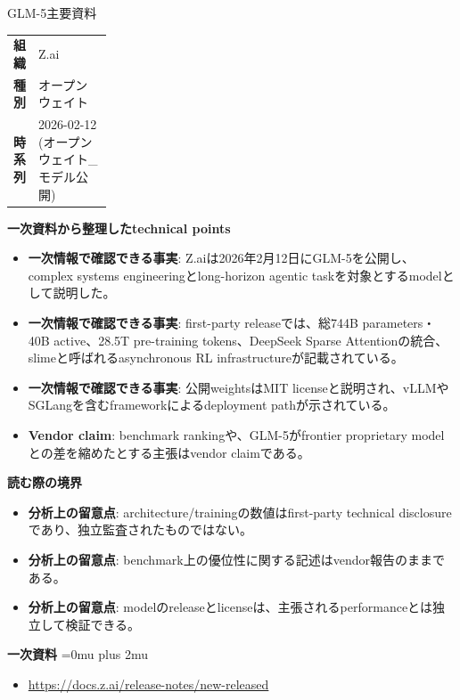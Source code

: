 \begin{technicalnote}{GLM-5}{主要資料}
\begingroup
\begin{tabularx}{\linewidth}{@{}>{\bfseries}p{0.22\linewidth}X@{}}
組織 & Z.ai \\
種別 & オープンウェイト \\
時系列 & 2026-02-12 (オープンウェイト\_モデル公開) \\
\end{tabularx}
\smallskip
{\bfseries 一次資料から整理したtechnical points}
\begin{itemize}[leftmargin=1.5em,itemsep=0.35em]
\item \textbf{一次情報で確認できる事実}: Z.aiは2026年2月12日にGLM-5を公開し、complex systems engineeringとlong-horizon agentic taskを対象とするmodelとして説明した。
\item \textbf{一次情報で確認できる事実}: first-party releaseでは、総744B parameters・40B active、28.5T pre-training tokens、DeepSeek Sparse Attentionの統合、slimeと呼ばれるasynchronous RL infrastructureが記載されている。
\item \textbf{一次情報で確認できる事実}: 公開weightsはMIT licenseと説明され、vLLMやSGLangを含むframeworkによるdeployment pathが示されている。
\item \textbf{Vendor claim}: benchmark rankingや、GLM-5がfrontier proprietary modelとの差を縮めたとする主張はvendor claimである。
\end{itemize}
\begin{minipage}{\linewidth}
{\bfseries 読む際の境界}
\begin{itemize}[leftmargin=1.5em,itemsep=0.35em]
\item \textbf{分析上の留意点}: architecture/trainingの数値はfirst-party technical disclosureであり、独立監査されたものではない。
\item \textbf{分析上の留意点}: benchmark上の優位性に関する記述はvendor報告のままである。
\item \textbf{分析上の留意点}: modelのreleaseとlicenseは、主張されるperformanceとは独立して検証できる。
\end{itemize}
\begin{samepage}
{\bfseries 一次資料}
\begingroup\sloppy
\Urlmuskip=0mu plus 2mu\relax
\begin{itemize}[leftmargin=1.5em,itemsep=0.25em]
\item {\scriptsize\url{https://docs.z.ai/release-notes/new-released}}
\end{itemize}
\endgroup
\end{samepage}
\end{minipage}
\endgroup
\end{technicalnote}
\medskip

